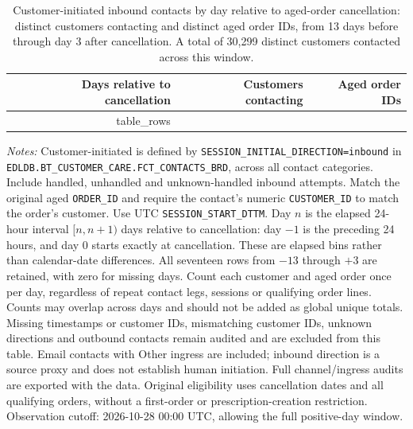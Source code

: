 \begin{table}[!htbp]
\centering
\caption{Customer-initiated inbound contacts by day relative to aged-order cancellation: distinct customers contacting and distinct aged order IDs, from 13 days before through day 3 after cancellation. A total of 30,299 distinct customers contacted across this window.}
\label{tab:aged-customer-contacts-by-cancellation-day}
\begin{tabular}{@{}rrr@{}}
\toprule
Days relative to cancellation & Customers contacting & Aged order IDs \\
\midrule
{{ table_rows }}
\bottomrule
\end{tabular}

\begin{minipage}{\linewidth}
\footnotesize
\textit{Notes:} Customer-initiated is defined by
\texttt{SESSION\_INITIAL\_DIRECTION=inbound} in
\texttt{EDLDB.BT\_CUSTOMER\_CARE.FCT\_CONTACTS\_BRD}, across all contact
categories. Include handled, unhandled and unknown-handled inbound attempts. Match the original aged \texttt{ORDER\_ID} and require
the contact's numeric \texttt{CUSTOMER\_ID} to match the order's customer.
Use UTC \texttt{SESSION\_START\_DTTM}. Day $n$ is the elapsed 24-hour interval
$[n,n+1)$ days relative to cancellation: day $-1$ is the preceding 24 hours,
and day $0$ starts exactly at cancellation. These are elapsed bins rather
than calendar-date differences. All seventeen rows from $-13$ through $+3$
are retained, with zero for missing days. Count each customer and aged order
once per day, regardless of repeat contact legs, sessions or qualifying order
lines. Counts may overlap across days and should not be added as global unique
totals. Missing timestamps or customer IDs, mismatching customer IDs, unknown
directions and outbound contacts remain audited and are excluded from this
table. Email contacts with Other ingress are included; inbound direction is
a source proxy and does not establish human initiation. Full channel/ingress
audits are exported with the data. Original eligibility uses cancellation
dates and all qualifying orders, without a first-order or prescription-creation
restriction. Observation cutoff: 2026-10-28 00:00 UTC, allowing the full positive-day window.
\end{minipage}
\end{table}
